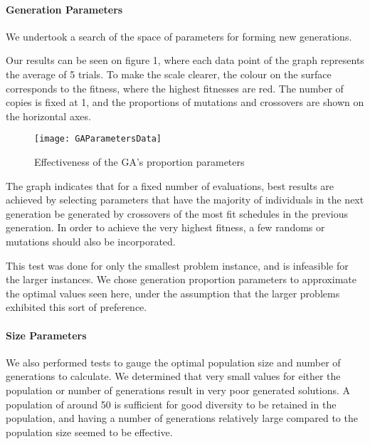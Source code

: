 \documentclass[letterpaper]{article}
\begin{document}
      \paragraph{Generation Parameters}
        We undertook a search of the space of parameters for forming new generations. 

        Our results can be seen on figure 1, where each data point of the graph 
        represents the average of 5 trials. To make the scale clearer, the colour 
        on the surface corresponds to the fitness, where the highest fitnesses 
        are red. The number of copies is fixed at 1, and the proportions of 
        mutations and crossovers are shown on the horizontal axes.
        
        \begin{figure}[h]
  		  \centering
  		  \texttt{[image: GAParametersData]}
  	      \caption{Effectiveness of the GA's proportion parameters}
  	      \label{graph:GAParam1}
		\end{figure}	
        
        The graph indicates that for a fixed number of evaluations, best results are 
        achieved by selecting parameters that have the majority of individuals in the next 
        generation be generated by crossovers of the most fit schedules in the previous 
        generation. In order to achieve the very highest fitness, a few randoms or mutations 
        should also be incorporated.
        
        This test was done for only the smallest problem instance, and is infeasible for the 
        larger instances. We chose generation proportion parameters to approximate the optimal 
        values seen here, under the assumption that the larger problems exhibited this sort of 
        preference.
        
      \paragraph{Size Parameters}
        We also performed tests to gauge the optimal population size and number of generations 
        to calculate. We determined that very small values for either the population or number 
        of generations result in very poor generated solutions. A population of around 50 is 
        sufficient for good diversity to be retained in the population, and having a number of 
        generations relatively large compared to the population size seemed to be effective.
       
\end{document}
